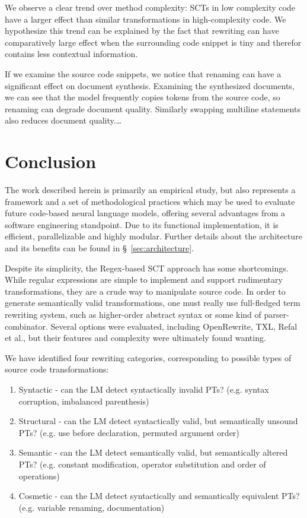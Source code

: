 \documentclass[sigconf,review,anonymous]{acmart}
\begin{document}
  We observe a clear trend over method complexity: SCTs in low complexity code have a larger effect than similar transformations in high-complexity code. We hypothesize this trend can be explained by the fact that rewriting can have comparatively large effect when the surrounding code snippet is tiny and therefor contains less contextual information.

  If we examine the source code snippets, we notice that renaming can have a significant effect on document synthesis. Examining the synthesized documents, we can see that the model frequently copies tokens from the source code, so renaming can degrade document quality. Similarly swapping multiline statements also reduces document quality.\ldots

  \section{Conclusion}\label{sec:conclusion}

  The work described herein is primarily an empirical study, but also represents a framework and a set of methodological practices which may be used to evaluate future code-based neural language models, offering several advantages from a software engineering standpoint. Due to its functional implementation, it is efficient, parallelizable and highly modular. Further details about the architecture and its benefits can be found in \S~\ref{sec:architecture}.

  Despite its simplicity, the Regex-based SCT approach has some shortcomings. While regular expressions are simple to implement and support rudimentary transformations, they are a crude way to manipulate source code. In order to generate semantically valid transformations, one must really use full-fledged term rewriting system, such as higher-order abstract syntax or some kind of parser-combinator. Several options were evaluated, including OpenRewrite, TXL, Refal et al., but their features and complexity were ultimately found wanting.

  We have identified four rewriting categories, corresponding to possible types of source code transformations:

  \begin{enumerate}
    \item Syntactic - can the LM detect syntactically invalid PTs? (e.g. syntax corruption, imbalanced parenthesis)
    \item Structural - can the LM detect syntactically valid, but semantically unsound PTs? (e.g. use before declaration, permuted argument order)
    \item Semantic - can the LM detect semantically valid, but semantically altered PTs? (e.g. constant modification, operator substitution and order of operations)
    \item Cosmetic - can the LM detect syntactically and semantically equivalent PTs? (e.g. variable renaming, documentation)
  \end{enumerate}
\end{document}
